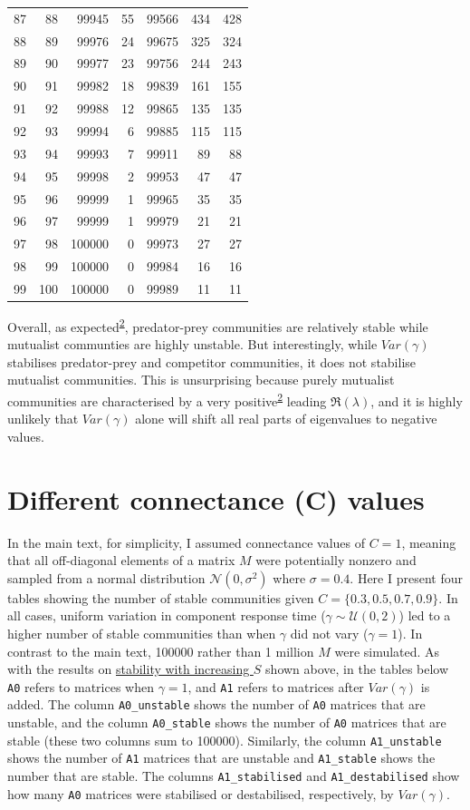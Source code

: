 \documentclass[]{article}
\begin{document}
\begin{longtable}[]{@{}rrrrrrr@{}}
87 & 88 & 99945 & 55 & 99566 & 434 & 428\tabularnewline
88 & 89 & 99976 & 24 & 99675 & 325 & 324\tabularnewline
89 & 90 & 99977 & 23 & 99756 & 244 & 243\tabularnewline
90 & 91 & 99982 & 18 & 99839 & 161 & 155\tabularnewline
91 & 92 & 99988 & 12 & 99865 & 135 & 135\tabularnewline
92 & 93 & 99994 & 6 & 99885 & 115 & 115\tabularnewline
93 & 94 & 99993 & 7 & 99911 & 89 & 88\tabularnewline
94 & 95 & 99998 & 2 & 99953 & 47 & 47\tabularnewline
95 & 96 & 99999 & 1 & 99965 & 35 & 35\tabularnewline
96 & 97 & 99999 & 1 & 99979 & 21 & 21\tabularnewline
97 & 98 & 100000 & 0 & 99973 & 27 & 27\tabularnewline
98 & 99 & 100000 & 0 & 99984 & 16 & 16\tabularnewline
99 & 100 & 100000 & 0 & 99989 & 11 & 11\tabularnewline
\bottomrule
\end{longtable}

Overall, as
expected\textsuperscript{\protect\hyperlink{ref-Allesina2012}{2}},
predator-prey communities are relatively stable while mutualist
communties are highly unstable. But interestingly, while \(Var(\gamma)\)
stabilises predator-prey and competitor communities, it does not
stabilise mutualist communities. This is unsurprising because purely
mutualist communities are characterised by a very
positive\textsuperscript{\protect\hyperlink{ref-Allesina2012}{2}}
leading \(\Re(\lambda)\), and it is highly unlikely that \(Var(\gamma)\)
alone will shift all real parts of eigenvalues to negative values.

\hypertarget{connectance}{\section{Different connectance (C)
values}\label{connectance}}

In the main text, for simplicity, I assumed connectance values of
\(C = 1\), meaning that all off-diagonal elements of a matrix \(M\) were
potentially nonzero and sampled from a normal distribution
\(\mathcal{N}(0, \sigma^{2})\) where \(\sigma = 0.4\). Here I present
four tables showing the number of stable communities given
\(C = \{0.3, 0. 5, 0.7, 0.9 \}\). In all cases, uniform variation in
component response time (\(\gamma \sim \mathcal{U}(0, 2)\)) led to a
higher number of stable communities than when \(\gamma\) did not vary
(\(\gamma = 1\)). In contrast to the main text, 100000 rather than 1
million \(M\) were simulated. As with the results on
\protect\hyperlink{IncrS}{stability with increasing \(S\)} shown above,
in the tables below \texttt{A0} refers to matrices when \(\gamma = 1\),
and \texttt{A1} refers to matrices after \(Var(\gamma)\) is added. The
column \texttt{A0\_unstable} shows the number of \texttt{A0} matrices
that are unstable, and the column \texttt{A0\_stable} shows the number
of \texttt{A0} matrices that are stable (these two columns sum to
100000). Similarly, the column \texttt{A1\_unstable} shows the number of
\texttt{A1} matrices that are unstable and \texttt{A1\_stable} shows the
number that are stable. The columns \texttt{A1\_stabilised} and
\texttt{A1\_destabilised} show how many \texttt{A0} matrices were
stabilised or destabilised, respectively, by \(Var(\gamma)\).
\end{document}
